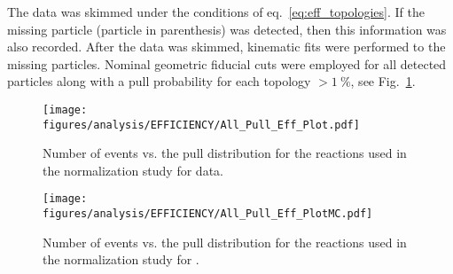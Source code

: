 The data was skimmed under the conditions of eq.~\ref{eq:eff_topologies}. If the missing particle (particle in parenthesis) was detected, then this information was also recorded. After the data was skimmed, kinematic fits were performed to the missing particles. Nominal geometric fiducial cuts were employed for all detected particles along with a pull probability for each topology  $>1~\%$, see Fig.~\ref{fig:eff_pull}.
\begin{figure}[h!]\begin{center}
\texttt{[image: \\figures/analysis/EFFICIENCY/All\_Pull\_Eff\_Plot.pdf]}
\caption[Number of events vs. the pull distribution for the reactions used in the normalization study for data]{\label{fig:eff_pull}Number of events vs. the pull distribution for the reactions used in the normalization study for data.}
\end{center}\end{figure}
\begin{figure}[h!]\begin{center}
\texttt{[image: \\figures/analysis/EFFICIENCY/All\_Pull\_Eff\_PlotMC.pdf]}
\caption[Number of events vs. the pull distribution for the reactions used in the normalization study for ]{\label{fig:eff_pullMC} Number of events vs. the pull distribution for the reactions used in the normalization study for .}
\end{center}\end{figure}


